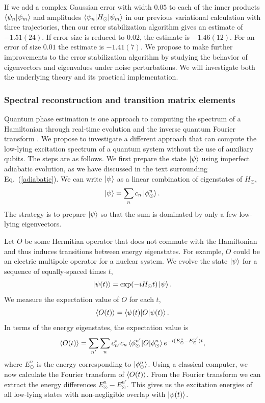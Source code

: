 \documentclass[aps,longbibliography,final,prl,onecolumn,superscriptaddress,nofootinbib,floatfix,11pt]{revtex4-1}
\begin{document}
If we add a complex Gaussian error with width $0.05$ to each of the inner products $\braket{\psi_n|\psi_m}$ and amplitudes $\braket{\psi_n|H_\odot|\psi_m}$ in our previous variational calculation with three trajectories, then our error stabilization algorithm gives an estimate of $-1.51(24)$. If error size is reduced to $0.02$, the estimate is $-1.46(12)$. For an error of size $0.01$ the estimate is $-1.41(7)$.  We propose to make further improvements to the error stabilization algorithm by studying the behavior of eigenvectors and eigenvalues under noise perturbations.  We will investigate both the underlying theory and its practical implementation. 

\subsubsection{Spectral reconstruction and transition matrix elements}
     
Quantum phase estimation is one approach to computing the spectrum of a Hamiltonian through real-time evolution and the inverse quantum Fourier transform \cite{Abrams:1999}.  We propose to investigate a different approach that can compute the low-lying excitation spectrum of a quantum system without the use of auxiliary qubits.  The steps are as follows.  We first prepare the state $\ket{\psi}$ using imperfect adiabatic evolution, as we have discussed in the text surrounding Eq.~(\ref{adiabatic}). We can write $\ket{\psi}$ as a linear combination of eigenstates of 
 $H_\odot$,
\begin{equation}
\ket{\psi} = \sum_n c_n \ket{\phi^n_\odot}.
\end{equation}The strategy is to prepare $\ket{\psi}$ so that the sum is dominated by only a few low-lying eigenvectors. 



Let $O$ be some Hermitian operator that does not commute with the Hamiltonian and thus induces  transitions between energy eigenstates.  For example, $O$ could be an electric multipole operator for a nuclear system. We evolve the state $\ket{\psi}$ for a sequence of equally-spaced times $t$,
\begin{equation}
\ket{\psi(t)} = \exp(-iH_{\odot}t) \ket{\psi}.
\end{equation}
We measure the expectation value of $O$ for each $t$, 
\begin{equation}
\braket{O(t)} = \braket{\psi(t)| O |\psi(t)}. 
\end{equation}
In terms of the energy eigenstates, the expectation value is 
\begin{equation}
\braket{O(t)} =   \sum_{n'}  \sum_n c^*_{n'} c_n \braket{\phi^{n'}_\odot|O|\phi^n_\odot}
e^{-i(E^{n}_\odot-E^{n'}_\odot)t},
\end{equation}
where $E^{n}_\odot$ is the energy corresponding to $\ket{\phi^n_\odot}$.
Using a classical computer, we now calculate the Fourier transform of $\braket{O(t)}$.  From the Fourier transform we can extract the energy differences $E^{n}_\odot-E^{n'}_\odot$.  This gives us the excitation energies
of all low-lying states with non-negligible overlap with $\ket{\psi(t)}$.
\end{document}
